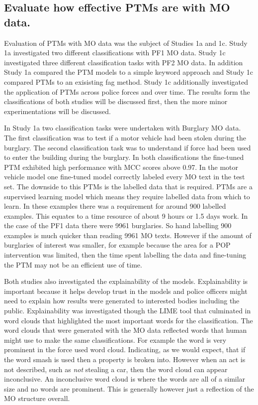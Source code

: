 \subsection{Evaluate how effective PTMs are with MO data.} Evaluation of PTMs with MO data was the subject of Studies 1a and 1c. Study 1a investigated two different classifications with PF1 MO data. Study 1c investigated three different classification tasks with PF2 MO data. In addition Study 1a compared the PTM models to a simple keyword approach and Study 1c compared PTMs to an exisisting fag method. Study 1c additionally investigated the application of PTMs across police forces and over time. The results form the classifications of both studies will be discussed first, then the more minor experimentations will be discussed.

In Study 1a two classification tasks were undertaken with Burglary MO data. The first classification was to test if a motor vehicle had been stolen during the burglary. The second classification task was to understand if force had been used to enter the building during the burglary. In both classifications the fine-tuned PTM exhibited high performance with MCC scores above 0.97. In the motor vehicle model one fine-tuned model correctly labeled every MO text in the test set.  The downside to this PTMs is the labelled data that is required. PTMs are a supervised learning model which means they require labelled data from which to learn. In these examples there was a requirement for around 900 labelled examples. This equates to a time resource of about 9 hours or 1.5 days work.  In the case of the PF1 data there were 9961 burglaries. So hand labelling 900 examples is much quicker than reading 9961 MO texts. However if the amount of burglaries of interest was smaller, for example because the area for a POP intervention was limited, then the time spent labelling the data and fine-tuning the PTM may not be an efficient use of time.


Both studies also investigated the explainability of the models. Explainability is important because it helps develop trust in the models and police officers might need to explain how results were generated to interested bodies including the public. Explainability was investigated though the LIME tool that culminated in word clouds that highlighted the most important words for the classification.  The word clouds that were generated with the MO data reflected words that human might use to make the same classifications. For example the word  is very prominent in the force used word cloud. Indicating, as we would expect, that if the word smash is used then a property is broken into. However when an act is not described, such as \emph{not} stealing a car, then the word cloud can appear inconclusive. An inconclusive word cloud is where the words are all of a similar size and no words are prominent. This is generally however just a reflection of the MO structure overall.

